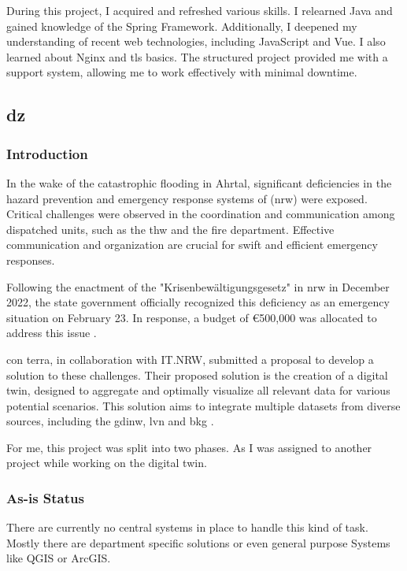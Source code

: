 \documentclass[11pt, titlepage, a4paper]{article}
\begin{document}
During this project, I acquired and refreshed various skills. I relearned Java and gained knowledge of the Spring Framework. Additionally, I deepened my understanding of recent web technologies, including JavaScript and  Vue. I also learned about Nginx and \gls{tls} basics.
The structured project provided me with a support system, allowing me to work effectively with minimal downtime.

\subsection{\gls{dz}}
\subsubsection{Introduction}
In the wake of the catastrophic flooding in Ahrtal, significant deficiencies in the hazard prevention and emergency response systems of (\gls {nrw}) were exposed. Critical challenges were observed in the coordination and communication among dispatched units, such as the  \gls{thw} and the fire department. \cite{anna-laraweidingerAhrtalHochwasser2024} Effective communication and organization are crucial for swift and efficient emergency responses.

Following the enactment of the "Krisenbewältigungsgesetz" in \gls {nrw} in December 2022, the state government officially recognized this deficiency as an emergency situation on February 23. In response, a budget of €500,000 was allocated to address this issue \cite{landesregierungnordrhein-westfalenGesetzZurErrichtung2022}.

con terra, in collaboration with IT.NRW, submitted a proposal to develop a solution to these challenges. Their proposed solution is the creation of a digital twin, designed to aggregate and optimally visualize all relevant data for various potential scenarios. This solution aims to integrate multiple datasets from diverse sources, including the \gls{gdinw}, \gls{lvn} and \gls{bkg} \cite{caffier14GDIForumNordrheinWestfalen}.

For me, this project was split into two phases. As I was assigned to another project while working on the digital twin.

\subsubsection{As-is Status}
There are currently no central systems in place to handle this kind of task. Mostly there are department specific solutions or even general purpose Systems like QGIS or ArcGIS.
\end{document}
